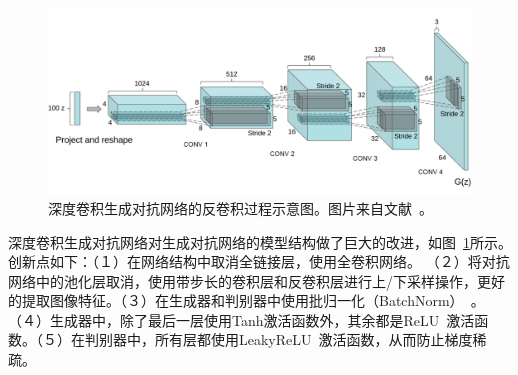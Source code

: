 \begin{figure}[ht]
    \centering
	\includegraphics[width=\textwidth]{figures/DCGAN.png}
	\caption{深度卷积生成对抗网络的反卷积过程示意图。图片来自文献~\cite{radford2015unsupervised}。}
	\label{fig:pic_dCGAN}
\end{figure}

深度卷积生成对抗网络对生成对抗网络的模型结构做了巨大的改进，如图~\ref{fig:pic_dCGAN}所示。创新点如下：（１）在网络结构中取消全链接层，使用全卷积网络。
（２）将对抗网络中的池化层取消，使用带步长的卷积层和反卷积层进行上/下采样操作，更好的提取图像特征。（３）在生成器和判别器中使用批归一化（BatchNorm）~\cite{ioffe2015batch}。
（４）生成器中，除了最后一层使用Tanh激活函数外，其余都是ReLU~\cite{nair2010rectified}激活函数。（５）在判别器中，所有层都使用LeakyReLU~\cite{xu2015empirical}激活函数，从而防止梯度稀疏。





